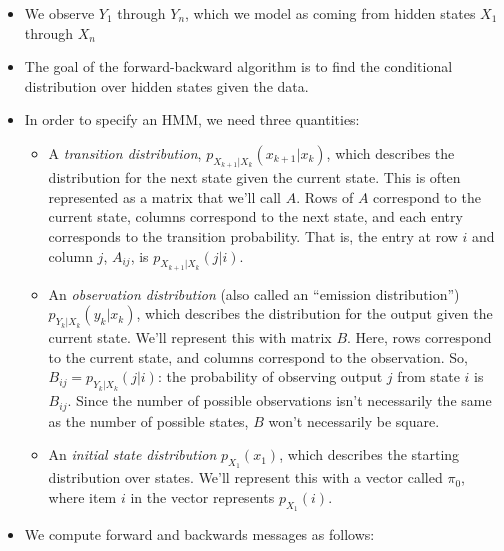 \documentclass[6008notes.tex]{subfiles}
\begin{document}
\begin{itemize}
\item We observe $Y_1$ through $Y_n$, which we model as coming from hidden states $X_1$ through $X_n$

\item The goal of the forward-backward algorithm is to find the conditional distribution over hidden states given the data.

\item In order to specify an HMM, we need three quantities:

\begin{itemize}
\item A \textit{transition distribution}, $p_{X_{k+1}|X_ k}(x_{k+1}|x_ k)$, which describes the distribution for the next state given the current state. This is often represented as a matrix that we'll call $A$. Rows of $A$ correspond to the current state, columns correspond to the next state, and each entry corresponds to the transition probability. That is, the entry at row $i$ and column $j$, $A_{ij}$, is $p_{X_{k+1}|X_ k}(j|i)$.

\item An \textit{observation distribution} (also called an ``emission distribution'') $p_{Y_ k|X_ k}(y_ k|x_ k)$, which describes the distribution for the output given the current state. We'll represent this with matrix $B$. Here, rows correspond to the current state, and columns correspond to the observation. So, $B_{ij} = p_{Y_ k|X_ k}(j|i)$: the probability of observing output $j$ from state $i$ is $B_{ij}$. Since the number of possible observations isn't necessarily the same as the number of possible states, $B$ won't necessarily be square.

\item An \textit{initial state distribution} $p_{X_1}(x_1)$, which describes the starting distribution over states. We'll represent this with a vector called $\pi_0$, where item $i$ in the vector represents $p_{X_1}(i)$.
\end{itemize}

\item We compute forward and backwards messages as follows:

{ \par}


\end{itemize}
\end{document}
